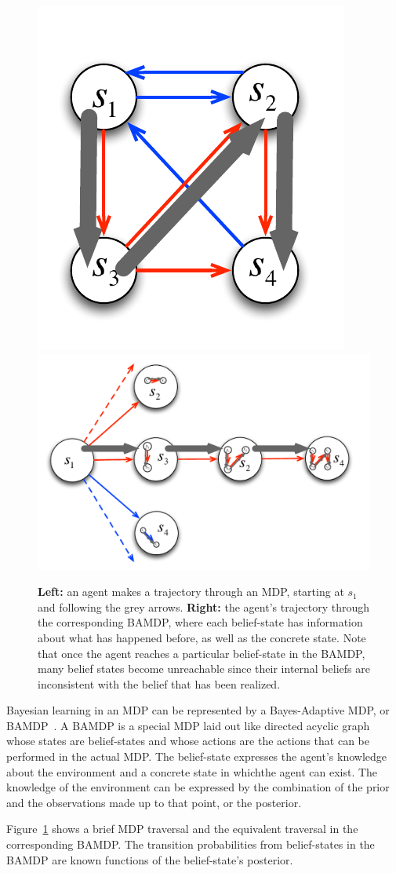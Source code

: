\begin{figure}[t]
\begin{center}
\includegraphics[width=0.25\linewidth]{bamdp-traversal-mdp.pdf}
\includegraphics[width=0.55\linewidth]{bamdp-traversal-bamdp.pdf}
\caption{{\bf Left:} an agent makes a trajectory through an MDP, starting at $s_1$ and following the grey arrows. {\bf Right:} the agent's trajectory through the corresponding BAMDP, where each belief-state has information about what has happened before, as well as the concrete state. Note that once the agent reaches a particular belief-state in the BAMDP, many belief states become unreachable since their internal beliefs are inconsistent with the belief that has been realized.}
\label{intro:bamdp-traversal}
\end{center}
\end{figure}

Bayesian learning in an MDP can be represented by a Bayes-Adaptive MDP, or BAMDP~\cite{duff03}. A BAMDP is a special MDP laid out like directed acyclic graph whose states are belief-states and whose actions are the actions that can be performed in the actual MDP. The belief-state expresses the agent's knowledge about the environment and a concrete state in whichthe agent can exist. The knowledge of the environment can be expressed by the combination of the prior and the observations made up to that point, or the posterior.

Figure~\ref{intro:bamdp-traversal} shows a brief MDP traversal and the equivalent traversal in the corresponding BAMDP. The transition probabilities from belief-states in the BAMDP are known functions of the belief-state's posterior.

